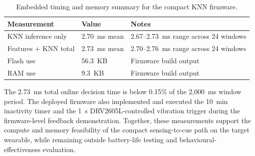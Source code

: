 \begin{table}[!htbp]
    \centering
    \footnotesize
    \caption{Embedded timing and memory summary for the compact KNN firmware.}
    \label{tab:knn_timing}
    \begin{tabularx}{\linewidth}{lXX}
        \toprule
        Measurement & Value & Notes \\
        \midrule
        KNN inference only & 2.70~ms mean & 2.67--2.73~ms range across 24 windows \\
        Features + KNN total & 2.73~ms mean & 2.70--2.76~ms range across 24 windows \\
        Flash use & 56.3~KB & Firmware build output \\
        RAM use & 9.3~KB & Firmware build output \\
        \bottomrule
    \end{tabularx}
\end{table}

The 2.73~ms total online decision time is below 0.15\% of the 2{,}000~ms window period. The deployed firmware also implemented and executed the 10~min inactivity timer and the 1~s DRV2605L-controlled vibration trigger during the firmware-level feedback demonstration. Together, these measurements support the compute and memory feasibility of the compact sensing-to-cue path on the target wearable, while remaining outside battery-life testing and behavioural-effectiveness evaluation.

\FloatBarrier

